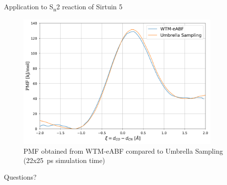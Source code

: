 \documentclass[10pt]{beamer}
\begin{document}
\begin{frame}{Application to S\textsubscript{n}2 reaction of Sirtuin 5}
   \begin{figure}[H]
     \centering
       \includegraphics[width=0.90\textwidth]{bilder/talk/sirt5_US}
      \caption{PMF obtained from WTM-eABF compared to Umbrella Sampling (22x25~ps simulation time)}
   \end{figure}
\end{frame}

\begin{frame}
\begin{center}
\Huge Questions?
\end{center}
\end{frame}
\end{document}
